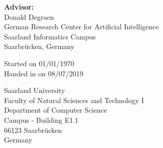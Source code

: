 \pagestyle{empty}

\vspace*{0.5cm}
\textbf{Advisor:}\\
Donald Degraen\\
German Research Center for Artificial Intelligence\\
Saarland Informatics Campus\\
Saarbrücken, Germany

\vspace{4.5cm}
Started on 01/01/1970\\
Handed in on 08/07/2019


\vspace{4.5cm}


\vspace{3cm}
Saarland University\\
Faculty of Natural Sciences and Technology I\\
Department of Computer Science\\
Campus - Building E1.1\\
66123 Saarbrücken\\
Germany\\


